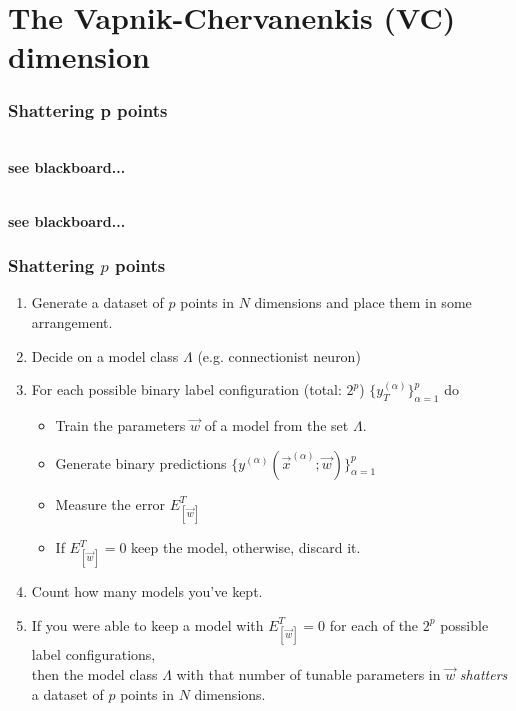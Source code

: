 \section{The Vapnik-Chervanenkis (VC) dimension}\label{seq:dvc}


\begin{frame}\frametitle{Shattering p points}

\\

\textbf{see blackboard...}


\\


\textbf{see blackboard...}

\end{frame}

\begin{frame}\frametitle{Shattering $p$ points}

\begin{enumerate}
\item Generate a dataset of $p$ points in $N$ dimensions and place them in some arrangement.
\pause
\item Decide on a model class $\Lambda$ (e.g. connectionist neuron)
\pause
\item For each possible binary label configuration (total: $2^p$) $\{y_T^{(\alpha)}\}_{\alpha=1}^p$ do
	\begin{itemize}
	\item[] Train the parameters $\vec w$ of a model from the set $\Lambda$.
	\item[] Generate binary predictions $\{y^{(\alpha)}(\vec x^{(\alpha)}; \vec w)\}_{\alpha=1}^p$
	\item[] Measure the error $E^T_{[\vec w]}$
	\item[] If $E^T_{[\vec w]} = 0$ keep the model, otherwise, discard it. 
	\end{itemize}
\item Count how many models you've kept.\\
\pause
\item[] If you were able to keep a model with $E^T_{[\vec w]} = 0$ for each of the $2^p$ possible label configurations,\\
then the model class $\Lambda$ with that number of tunable parameters in $\vec w$ \emph{shatters} a dataset of $p$ points in $N$ dimensions.
\end{enumerate}

\end{frame}


